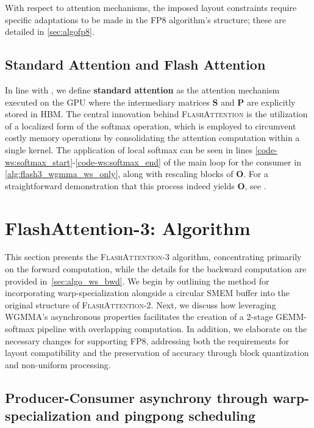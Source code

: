 With respect to attention mechanisms, the imposed layout constraints require specific adaptations to be made in the FP8 algorithm's structure; these are detailed in \cref{sec:algofp8}.

\subsection{Standard Attention and Flash Attention} In line with \citet{dao2022flashattention}, we define \textbf{standard attention} as the attention mechanism executed on the GPU where the intermediary matrices $\mathbf{S}$ and $\mathbf{P}$ are explicitly stored in HBM. The central innovation behind \textsc{FlashAttention} is the utilization of a localized form of the softmax operation, which is employed to circumvent costly memory operations by consolidating the attention computation within a single kernel. The application of local softmax can be seen in lines \ref{code-ws:softmax_start}-\ref{code-ws:softmax_end} of the main loop for the consumer in \cref{alg:flash3_wgmma_ws_only}, along with rescaling blocks of $\mathbf{O}$. For a straightforward demonstration that this process indeed yields $\mathbf{O}$, see \cite[\S 2.3.1]{dao2023flashattention2}.

\section{FlashAttention-3: Algorithm}
\label{sec:algo}

This section presents the \textsc{FlashAttention-3} algorithm, concentrating primarily on the forward computation, while the details for the backward computation are provided in~\cref{sec:algo_ws_bwd}. We begin by outlining the method for incorporating warp-specialization alongside a circular SMEM buffer into the original structure of \textsc{FlashAttention-2}. Next, we discuss how leveraging WGMMA’s asynchronous properties facilitates the creation of a 2-stage GEMM-softmax pipeline with overlapping computation. In addition, we elaborate on the necessary changes for supporting FP8, addressing both the requirements for layout compatibility and the preservation of accuracy through block quantization and non-uniform processing.

\subsection{Producer-Consumer asynchrony through warp-specialization and pingpong scheduling}
\label{sec:algo_ws}

